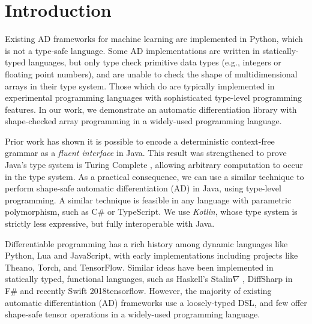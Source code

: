 \documentclass{article}
\begin{document}


\printAffiliationsAndNotice{}  %

\section{Introduction}
\label{submission}

Existing AD frameworks for machine learning are implemented in Python, which is not a type-safe language. Some AD implementations are written in statically-typed languages, but only type check primitive data types (e.g., integers or floating point numbers), and are unable to check the shape of multidimensional arrays in their type system. Those which do are typically implemented in experimental programming languages with sophisticated type-level programming features. In our work, we demonstrate an automatic differentiation library with shape-checked array programming in a widely-used programming language.

Prior work has shown it is possible to encode a deterministic context-free grammar as a \textit{fluent interface} \cite{gil2016formal} in Java. This result was strengthened to prove Java's type system is Turing Complete \cite{grigore2017java}, allowing arbitrary computation to occur in the type system. As a practical consequence, we can use a similar technique to perform shape-safe automatic differentiation (AD) in Java, using type-level programming. A similar technique is feasible in any language with parametric polymorphism, such as C\# or TypeScript. We use \textit{Kotlin}, whose type system is strictly less expressive, but fully interoperable with Java.

Differentiable programming has a rich history among dynamic languages like Python, Lua and JavaScript, with early implementations including projects like Theano, Torch, and TensorFlow. Similar ideas have been implemented in statically typed, functional languages, such as Haskell's Stalin$\nabla$ \cite{pearlmutter2008using}, DiffSharp in F\# \cite{baydin2015diffsharp} and recently Swift \citelattner2018tensorflow. However, the majority of existing automatic differentiation (AD) frameworks use a loosely-typed DSL, and few offer shape-safe tensor operations in a widely-used programming language.
\end{document}
